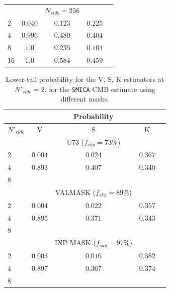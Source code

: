 \begin{table}
\begin{tabular}{@{}lcccc}
 & & $N_{side} = 256$ & \\
$2$ & $ 0.040 $ & $ 0.123 $ & $ 0.225 $ \\ 
$4$ & $ 0.996 $ & $ 0.480 $ & $ 0.404 $  \\
$8$ & $ 1.0 $ & $ 0.235 $ & $ 0.104 $  \\
$16$ & $ 1.0$ & $ 0.584 $ & $ 0.459 $  \\
\hline
\end{tabular} 
\end{table}

\begin{table}
\centering
\caption{Lower-tail probability for the V, S, K estimators at $N'_{side}=2$, for the \texttt{SMICA} CMB estimate using different masks.}
\label{table:3}
\begin{tabular}{@{}lcccc}
\hline 
  & & Probability & \\
\hline  
$N'_{side}$ & V & S & K \\ 
\hline  
 & & U73 ($f_{sky} = 73\%$) & \\
$2$ & $ 0.004 $ & $ 0.024 $ & $ 0.367 $ \\ 
$4$ & $ 0.893 $ & $ 0.407 $ & $ 0.340 $  \\
$8$ & $  $ & $  $ & $  $  \\
 & & VALMASK ($f_{sky} = 89\%$) & \\
$2$ & $ 0.004 $ & $ 0.022 $ & $ 0.357 $ \\ 
$4$ & $ 0.895 $ & $ 0.371 $ & $ 0.343 $  \\
$8$ & $  $ & $  $ & $  $  \\
 & & INP$\_$MASK ($f_{sky} = 97\%$) & \\
$2$ & $ 0.003 $ & $ 0.016 $ & $ 0.382 $ \\ 
$4$ & $ 0.897 $ & $ 0.367$ & $ 0.374 $  \\
$8$ & $  $ & $  $ & $  $  \\
\hline
\end{tabular} 
\end{table}


